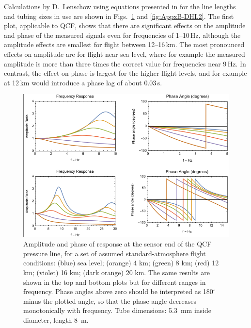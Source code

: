 \documentclass[12pt,twoside,english]{article}\usepackage[]{graphicx}\usepackage[]{color}
\begin{document}
{{Calculations by D.~Lenschow using equations presented in \citet{Iberall1950} for the line lengths and tubing sizes in use are shown in Figs.~\ref{fig:AppxB-DHL1} and \ref{fig:AppxB-DHL2}. The first plot, applicable to QCF, shows that there are significant effects on the amplitude and phase of the measured signals even for frequencies of 1--10\,Hz, although the amplitude effects are smallest for flight between 12--16\,km. The most pronounced effects on amplitude are for flight near sea level, where for example the measured amplitude is more than three times the correct value for frequencies near 9\,Hz. In contrast, the effect on phase is largest for the higher flight levels, and for example at 12\,km would introduce a phase lag of about 0.03\,s. 
\begin{figure}
\noindent \begin{centering}
\includegraphics[height=0.4\textheight]{SpecialGraphics/PressureLines1.png}  
\par\end{centering}

\protect\caption[Amplitude ratio and phase for transmission through the QCF pressure line.]{\label{fig:AppxB-DHL1}Amplitude and phase of response at the sensor end of the QCF pressure line, for a set of assumed standard-atmosphere flight conditions: (blue) sea level; (orange) 4 km; (green) 8 km; (red) 12 km; (violet) 16 km; (dark orange) 20 km. The same results are shown in the top and bottom plots but for different ranges in frequency. Phase angles above zero should be interpreted as 180$^{\circ}$ minus the plotted angle, so that the phase angle decreases monotonically with frequency. Tube dimensions: 5.3~mm inside diameter, length 8~m. } 
\end{figure}

}}
\end{document}
